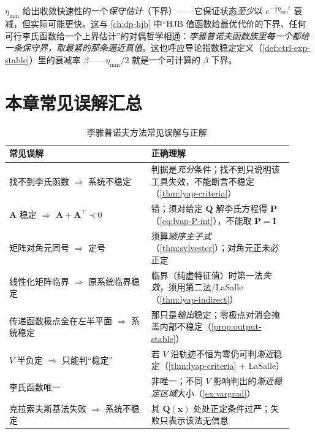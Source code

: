 \begin{insight}
$\eta_{\min}$ 给出收敛快速性的一个\emph{保守估计}（下界）——它保证状态\emph{至少}以 $e^{-\frac12\eta_{\min}t}$ 衰减，但实际可能更快。这与 \cref{ch:dp-hjb} 中“HJB 值函数给最优代价的下界、任何可行李氏函数给一个上界估计”的对偶哲学相通：\emph{李雅普诺夫函数族里每一个都给一条保守界，取最紧的那条逼近真值}。这也呼应导论指数稳定定义（\cref{def:ctrl-exp-stable}）里的衰减率 $\beta$——$\eta_{\min}/2$ 就是一个可计算的 $\beta$ 下界。
\end{insight}

\section*{本章常见误解汇总}
\label{sec:lyap-misconceptions}

\begin{table}[H]\centering\small
\caption{李雅普诺夫方法常见误解与正解}
\begin{tabular}{p{0.46\linewidth}p{0.46\linewidth}}
\toprule
\textbf{常见误解} & \textbf{正确理解} \\
\midrule
找不到李氏函数 $\Rightarrow$ 系统不稳定 & 判据是\emph{充分}条件；找不到只说明该工具失效，不能断言不稳定（\cref{thm:lyap-criteria}）\\
$\mathbf{A}$ 稳定 $\Rightarrow$ $\mathbf{A}+\mathbf{A}^\top\prec0$ & 错；须对给定 $\mathbf{Q}$ 解李氏方程得 $\mathbf{P}$（\cref{eq:lyap-P-int}），不能取 $\mathbf{P}=\mathbf{I}$ \\
矩阵对角元同号 $\Rightarrow$ 定号 & 须算\emph{顺序主子式}（\cref{thm:sylvester}）；对角元正未必正定 \\
线性化矩阵临界 $\Rightarrow$ 原系统临界稳定 & 临界（纯虚特征值）时第一法\emph{失效}，须用第二法/LaSalle（\cref{thm:lyap-indirect}）\\
传递函数极点全在左半平面 $\Rightarrow$ 系统稳定 & 那只是\emph{输出}稳定；零极点对消会掩盖内部不稳定（\cref{prop:output-stable}）\\
$\dot V$ 半负定 $\Rightarrow$ 只能判“稳定” & 若 $\dot V$ 沿轨迹不恒为零仍可判\emph{渐近}稳定（\cref{thm:lyap-criteria} + LaSalle）\\
李氏函数唯一 & 非唯一；不同 $V$ 影响判出的\emph{渐近稳定区域}大小（\cref{ex:vargrad}）\\
克拉索夫斯基法失败 $\Rightarrow$ 系统不稳定 & 其 $\mathbf{Q}(\mathbf{x})$ 处处正定条件过严；失败只表示该法无信息 \\
\bottomrule
\end{tabular}
\end{table}

